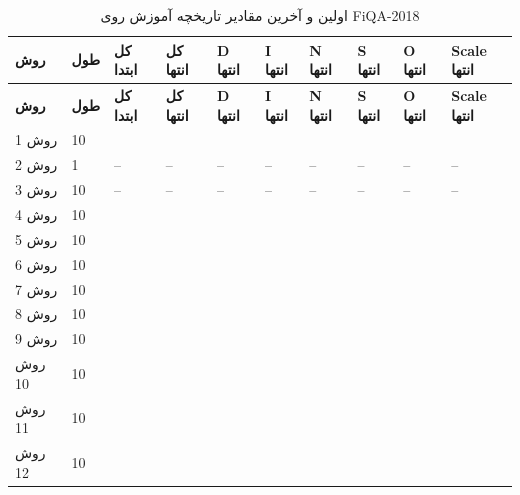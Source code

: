\documentclass[a4paper,12pt]{article}
\begin{document}
\begin{landscape}
\scriptsize
\begin{longtable}{|C{2.2cm}|C{1.2cm}|C{1.8cm}|C{1.8cm}|C{1.8cm}|C{1.8cm}|C{1.8cm}|C{1.8cm}|C{1.8cm}|C{2cm}|}
\caption{اولین و آخرین مقادیر تاریخچه آموزش روی FiQA-2018}\label{tab:fiqa-training-full}\\
\hline
\textbf{روش} & \textbf{طول} & \textbf{کل ابتدا} & \textbf{کل انتها} & \textbf{D انتها} & \textbf{I انتها} & \textbf{N انتها} & \textbf{S انتها} & \textbf{O انتها} & \textbf{Scale انتها} \\
\hline
\endfirsthead
\hline
\textbf{روش} & \textbf{طول} & \textbf{کل ابتدا} & \textbf{کل انتها} & \textbf{D انتها} & \textbf{I انتها} & \textbf{N انتها} & \textbf{S انتها} & \textbf{O انتها} & \textbf{Scale انتها} \\
\hline
\endhead
روش 1 & 10 &  &  &  &  &  &  &  &  \\
\hline
روش 2 & 1 & -- & -- & -- & -- & -- & -- & -- & -- \\
\hline
روش 3 & 10 & -- & -- & -- & -- & -- & -- & -- & -- \\
\hline
روش 4 & 10 &  &  &  &  &  &  &  &  \\
\hline
روش 5 & 10 &  &  &  &  &  &  &  &  \\
\hline
روش 6 & 10 &  &  &  &  &  &  &  &  \\
\hline
روش 7 & 10 &  &  &  &  &  &  &  &  \\
\hline
روش 8 & 10 &  &  &  &  &  &  &  &  \\
\hline
روش 9 & 10 &  &  &  &  &  &  &  &  \\
\hline
روش 10 & 10 &  &  &  &  &  &  &  &  \\
\hline
روش 11 & 10 &  &  &  &  &  &  &  &  \\
\hline
روش 12 & 10 &  &  &  &  &  &  &  &  \\

\end{longtable}
\end{landscape}
\end{document}
